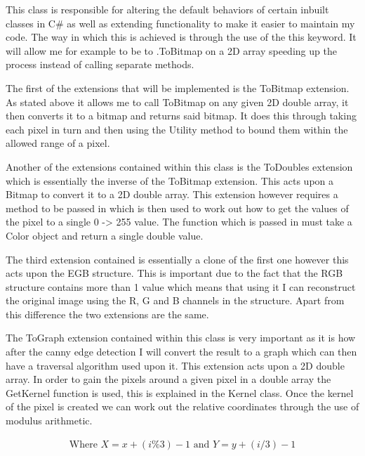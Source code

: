 \begin{FlushLeft}
    This class is responsible for altering the default behaviors of certain inbuilt classes in C# as well as extending functionality to make it easier to maintain my code. The way in which this is achieved is through the use of the this keyword. It will allow me for example to be to .ToBitmap on a 2D array speeding up the process instead of calling separate methods.\\ \bk

    The first of the extensions that will be implemented is the ToBitmap extension. As stated above it allows me to call ToBitmap on any given 2D double array, it then converts it to a bitmap and returns said bitmap. It does this through taking each pixel in turn and then using the Utility method to bound them within the allowed range of a pixel. \\ \bk

    Another of the extensions contained within this class is the ToDoubles extension which is essentially the inverse of the ToBitmap extension. This acts upon a Bitmap to convert it to a 2D double array. This extension however requires a method to be passed in which is then used to work out how to get the values of the pixel to a single 0 -> 255 value. The function which is passed in must take a Color object and return a single double value. \\ \bk

    The third extension contained is essentially a clone of the first one however this acts upon the EGB structure. This is important due to the fact that the RGB structure contains more than 1 value which means that using it I can reconstruct the original image using the R, G and B channels in the structure. Apart from this difference the two extensions are the same. \\ \bk

    The ToGraph extension contained within this class is very important as it is how after the canny edge detection I will convert the result to a graph which can then have a traversal algorithm used upon it. This extension acts upon a 2D double array. In order to gain the pixels around a given pixel in a double array the GetKernel function is used, this is explained in the Kernel class. Once the kernel of the pixel is created we can work out the relative coordinates through the use of modulus arithmetic.

    \begin{gather*}
        \text{Where } X = x + (i \% 3) -1 \text{ and } Y = y + (i / 3) - 1 \\
    \end{gather*} \\ 


\end{FlushLeft}
